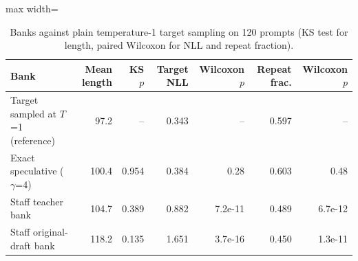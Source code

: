 \begin{table}[!htb]
\centering
\scriptsize
\setlength{\tabcolsep}{3.5pt}
\caption{Banks against plain temperature-1 target sampling on 120 prompts (KS test for length, paired Wilcoxon for NLL and repeat fraction).}
\label{tab:t3consist}
\begin{adjustbox}{max width=\linewidth}
\begin{tabular}{lrrrrrr}
\toprule
Bank & Mean length & KS $p$ & Target NLL & Wilcoxon $p$ & Repeat frac. & Wilcoxon $p$ \\
\midrule
Target sampled at $T$=1 (reference) & 97.2 & -- & 0.343 & -- & 0.597 & -- \\
Exact speculative ($\gamma$=4) & 100.4 & 0.954 & 0.384 & 0.28 & 0.603 & 0.48 \\
Staff teacher bank & 104.7 & 0.389 & 0.882 & 7.2e-11 & 0.489 & 6.7e-12 \\
Staff original-draft bank & 118.2 & 0.135 & 1.651 & 3.7e-16 & 0.450 & 1.3e-11 \\
\bottomrule
\end{tabular}
\end{adjustbox}
\end{table}
